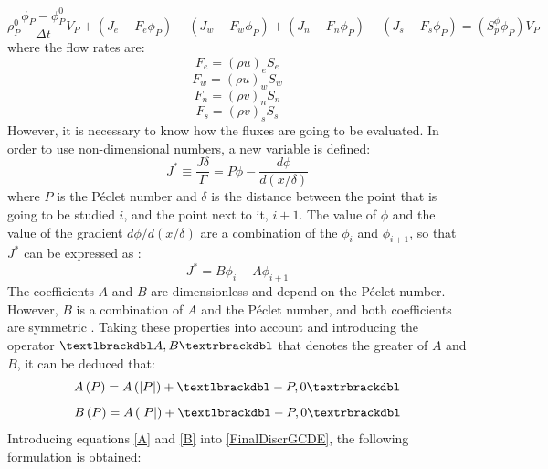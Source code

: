 \begin{equation}
\rho_{P}^{0}\frac{\phi_{P}-\phi_{P}^{0}}{\Delta t}V_{P}+\left(J_{e}-F_{e}\phi_{P}\right)-\left(J_{w}-F_{w}\phi_{P}\right)+\left(J_{n}-F_{n}\phi_{P}\right)-\left(J_{s}-F_{s}\phi_{P}\right)=\left(S_{p}^{\phi}\phi_{P}\right)V_{P}
\label{FinalDiscrGCDE}
\end{equation}
where the flow rates are:
\begin{equation}
F_{e}=\left(\rho u\right)_{e}S_{e}
\end{equation}
\begin{equation}
F_{w}=\left(\rho u\right)_{w}S_{w}
\end{equation}
\begin{equation}
F_{n}=\left(\rho v\right)_{n}S_{n}
\end{equation}
\begin{equation}
F_{s}=\left(\rho v\right)_{s}S_{s}
\end{equation}
However, it is necessary to know how the fluxes are going to be evaluated. In order to use non-dimensional numbers, a new variable is defined:
\begin{equation}
	J^{*}\equiv\frac{J\delta}{\Gamma}=P\phi-\frac{d\phi}{d\left(x/\delta\right)}
\end{equation}
where $P$ is the Péclet number and $\delta$ is the distance between the point that is going to be studied $i$, and the point next to it, $i+1$. The value of $\phi$ and the value of the gradient $d\phi/d\left(x/\delta\right)$ are a combination of the $\phi_{i}$ and $\phi_{i+1}$, so that $J^{*}$ can be expressed as \cite{Patankar1980}:
\begin{equation}
J^{*}=B\phi_{i}-A\phi_{i+1}
\end{equation}
The coefficients $A$ and $B$ are dimensionless and depend on the Péclet number. However, $B$ is a combination of $A$ and the Péclet number, and both coefficients are symmetric \cite{Patankar1980}. Taking these properties into account and introducing the operator $\textlbrackdbl A,B\textrbrackdbl$ that denotes the greater of $A$ and $B$, it can be deduced that:
\begin{equation}
A\left(P\right)=A\left(|P|\right)+\textlbrackdbl-P,0\textrbrackdbl
\label{A}
\end{equation}
\begin{equation}
B\left(P\right)=A\left(|P|\right)+\textlbrackdbl-P,0\textrbrackdbl
\label{B}
\end{equation}
Introducing equations \ref{A} and \ref{B} into \ref{FinalDiscrGCDE}, the following formulation is obtained:
